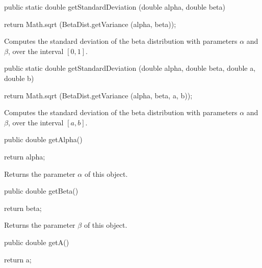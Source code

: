 \begin{code}

   public static double getStandardDeviation (double alpha, double beta) \begin{hide} {
      return Math.sqrt (BetaDist.getVariance (alpha, beta));
   }\end{hide}
\end{code}
\begin{tabb}  Computes the standard deviation of the beta distribution with
   parameters $\alpha$ and $\beta$, over the interval $[0, 1]$.
\end{tabb}
\begin{htmlonly}
\end{htmlonly}
\begin{code}

   public static double getStandardDeviation (double alpha, double beta,
                                              double a, double b) \begin{hide} {
      return Math.sqrt (BetaDist.getVariance (alpha, beta, a, b));
   }\end{hide}
\end{code}
\begin{tabb}  Computes the standard deviation of the beta distribution with
   parameters $\alpha$ and $\beta$, over the interval $[a, b]$.
\end{tabb}
\begin{htmlonly}
\end{htmlonly}
\begin{code}

   public double getAlpha()\begin{hide} {
      return alpha;
   }\end{hide}
\end{code}
  \begin{tabb} Returns the parameter $\alpha$ of this object.
  \end{tabb}
\begin{code}

   public double getBeta()\begin{hide} {
      return beta;
   }\end{hide}
\end{code}
  \begin{tabb} Returns the parameter $\beta$ of this object.
  \end{tabb}
\begin{code}

   public double getA()\begin{hide} {
      return a;
   }\end{hide}
\end{code}
